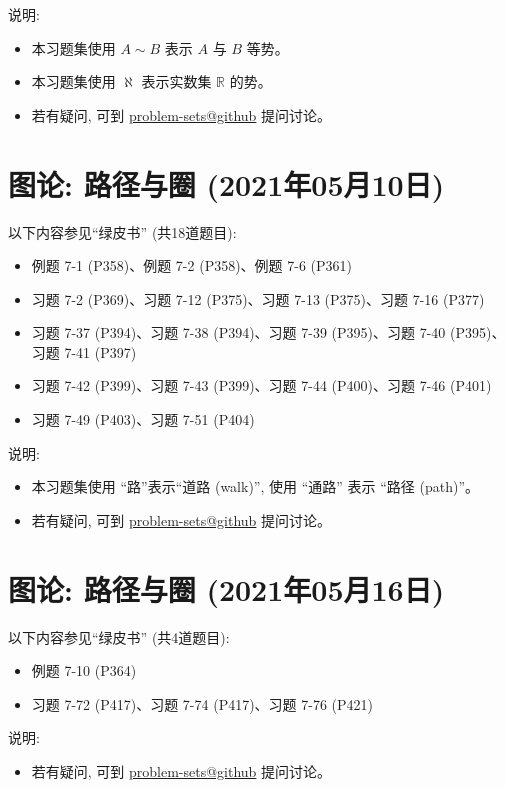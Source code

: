 \documentclass{article}
\begin{document}
说明:
\begin{itemize}
  \item 本习题集使用 $A \sim B$ 表示 $A$ 与 $B$ 等势。
  \item 本习题集使用 $\aleph$ 表示实数集 $\mathbb{R}$ 的势。
  \item 若有疑问, 可到 \href{https://github.com/courses-at-nju-by-hfwei/discrete-math-problem-sets/discussions}{problem-sets@github} 提问讨论。
\end{itemize}
\section{图论: 路径与圈 (2021年05月10日)}

以下内容参见``绿皮书'' (共18道题目):
\begin{itemize}
  \item 例题 7-1 (P358)、例题 7-2 (P358)、例题 7-6 (P361)
  \item 习题 7-2 (P369)、习题 7-12 (P375)、习题 7-13 (P375)、习题 7-16 (P377)
  \item 习题 7-37 (P394)、习题 7-38 (P394)、习题 7-39 (P395)、习题 7-40 (P395)、
  习题 7-41 (P397)
  \item 习题 7-42 (P399)、习题 7-43 (P399)、习题 7-44 (P400)、习题 7-46 (P401)
  \item 习题 7-49 (P403)、习题 7-51 (P404)
\end{itemize}

说明:
\begin{itemize}
  \item 本习题集使用 ``路''表示``道路 (walk)'', 使用 ``通路'' 表示 ``路径 (path)''。
  \item 若有疑问, 可到 \href{https://github.com/courses-at-nju-by-hfwei/discrete-math-problem-sets/discussions}{problem-sets@github} 提问讨论。
\end{itemize}
\section{图论: 路径与圈 (2021年05月16日)}

以下内容参见``绿皮书'' (共4道题目):
\begin{itemize}
  \item 例题 7-10 (P364)
  \item 习题 7-72 (P417)、习题 7-74 (P417)、习题 7-76 (P421)
\end{itemize}

说明:
\begin{itemize}
  \item 若有疑问, 可到 \href{https://github.com/courses-at-nju-by-hfwei/discrete-math-problem-sets/discussions}{problem-sets@github} 提问讨论。
\end{itemize}
\end{document}
